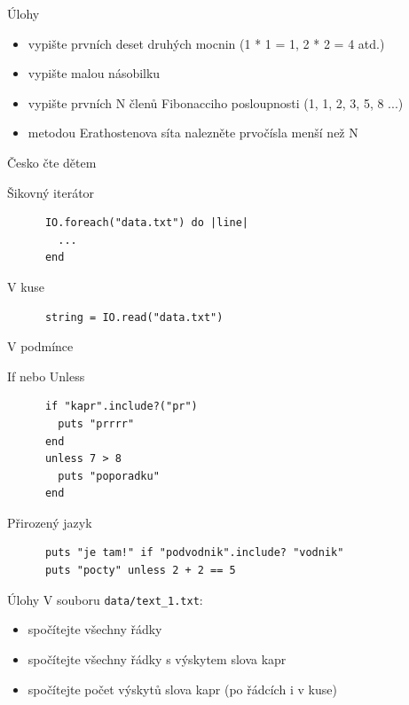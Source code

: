 \documentclass{beamer}
\begin{document}
\begin{frame}{Úlohy}
  \begin{itemize}
    \item vypište prvních deset druhých mocnin (1 * 1 = 1, 2 * 2 = 4 atd.)
    \item vypište malou násobilku
    \item vypište prvních N členů Fibonacciho posloupnosti (1, 1, 2, 3, 5, 8 ...)
    \item metodou Erathostenova síta nalezněte prvočísla menší než N
  \end{itemize}
\end{frame}

\begin{frame}[fragile]{Česko čte dětem}
  \begin{block}{Šikovný iterátor}
    \begin{verbatim}
      IO.foreach("data.txt") do |line|
        ...
      end
    \end{verbatim}
  \end{block}
  \pause
  \begin{block}{V kuse}
    \begin{verbatim}
      string = IO.read("data.txt")
    \end{verbatim}
  \end{block}
\end{frame}

\begin{frame}[fragile]{V podmínce}
  \begin{block}{If nebo Unless}
    \scriptsize
    \begin{verbatim}
      if "kapr".include?("pr")
        puts "prrrr"
      end
      unless 7 > 8
        puts "poporadku"
      end
    \end{verbatim}
  \end{block}
  \pause
  \begin{block}{Přirozený jazyk}
    \scriptsize
    \begin{verbatim}
      puts "je tam!" if "podvodnik".include? "vodnik"
      puts "pocty" unless 2 + 2 == 5
    \end{verbatim}
  \end{block}
\end{frame}

\begin{frame}{Úlohy}
  V souboru \texttt{data/text\_1.txt}:
  \begin{itemize}
    \item spočítejte všechny řádky
    \item spočítejte všechny řádky s výskytem slova kapr
    \item spočítejte počet výskytů slova kapr (po řádcích i v kuse)
  \end{itemize}
\end{frame}
\end{document}
